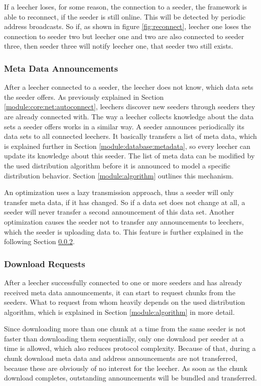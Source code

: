 If a leecher loses, for some reason, the connection to a seeder, the framework is able to reconnect, if the seeder is still online. This will be detected by periodic address broadcasts. So if, as shown in figure \ref{fig:reconnect}, leecher one loses the connection to seeder two but leecher one and two are also connected to seeder three, then seeder three will notify leecher one, that seeder two still exists.


\subsubsection{Meta Data Announcements}
\label{module:core:net:annoucements}
After a leecher connected to a seeder, the leecher does not know, which data sets the seeder offers. As previously explained in Section \ref{module:core:net:autoconnect}, leechers discover new seeders through seeders they are already connected with. The way a leecher collects knowledge about the data sets a seeder offers works in a similar way. A seeder announces periodically its data sets to all connected leechers. It basically transfers a list of meta data, which is explained further in Section \ref{module:database:metadata}, so every leecher can update its knowledge about this seeder. The list of meta data can be modified by the used distribution algorithm before it is announced to model a specific distribution behavior. Section \ref{module:algorithm} outlines this mechanism.

An optimization uses a lazy transmission approach, thus a seeder will only transfer meta data, if it has changed. So if a data set does not change at all, a seeder will never transfer a second announcement of this data set. Another optimization causes the seeder not to transfer any announcements to leechers, which the seeder is uploading data to. This feature is further explained in the following Section \ref{module:core:net:downloadreq}.


\subsubsection{Download Requests}
\label{module:core:net:downloadreq}
After a leecher successfully connected to one or more seeders and has already received meta data announcements, it can start to request chunks from the seeders. What to request from whom heavily depends on the used distribution algorithm, which is explained in Section \ref{module:algorithm} in more detail. 

Since downloading more than one chunk at a time from the same seeder is not faster than downloading them sequentially, only one download per seeder at a time is allowed, which also reduces protocol complexity. Because of that, during a chunk download meta data and address announcements are not transferred, because these are obviously of no interest for the leecher. As soon as the chunk download completes, outstanding announcements will be bundled and transferred.

